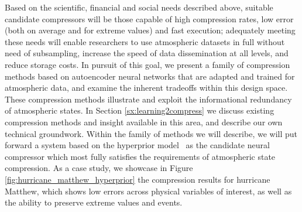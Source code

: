 \documentclass[11pt, a4paper, logo, copyright, numbering]{googledeepmind}
\begin{document}
Based on the scientific, financial and social needs described above, suitable candidate compressors will be those capable of high compression rates, low error (both on average and for extreme values) and fast execution; adequately meeting these needs will enable researchers to use atmospheric datasets in full without need of subsampling, increase the speed of data dissemination at all levels, and reduce storage costs.
In pursuit of this goal, we present a family of compression methods based on autoencoder neural networks that are adapted and trained for atmospheric data, and examine the inherent tradeoffs within this design space.
These compression methods illustrate and exploit the informational redundancy of atmospheric states.
In Section \ref{sx:learning2compress} we discuss existing compression methods and insight available in this area, and describe our own technical groundwork.
Within the family of methods we will describe, we will put forward a system based on the hyperprior model~\citep{balle2018hp} as the candidate neural compressor which most fully satisfies the requirements of atmospheric state compression.
As a case study, we showcase in Figure \ref{fig:hurricane_matthew_hyperprior} the compression results for hurricane Matthew, which shows low errors across physical variables of interest, as well as the ability to preserve extreme values and events.  
\end{document}
